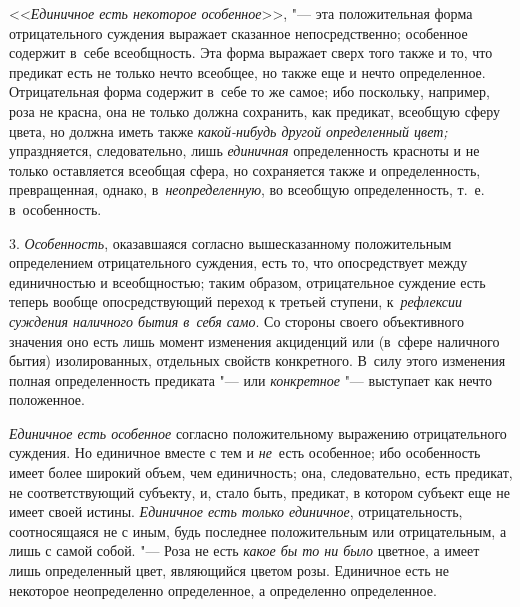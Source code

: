 <<{\em Единичное есть некоторое особенное}>>, "--- эта положительная форма
отрицательного суждения выражает сказанное непосредственно; особенное содержит
в~себе всеобщность. Эта форма выражает сверх того также и то, что предикат есть
не только нечто всеобщее, но также еще и нечто определенное. Отрицательная
форма содержит в~себе то же самое; ибо поскольку, например, роза не красна, она
не только должна сохранить, как предикат, всеобщую сферу цвета, но должна иметь
также {\em какой-нибудь другой определенный цвет;} упраздняется, следовательно,
лишь {\em единичная} определенность красноты и не только оставляется всеобщая
сфера, но сохраняется также и определенность, превращенная, однако,
в~{\em неопределенную}, во всеобщую определенность, т.~е. в~особенность.

3. {\em Особенность}, оказавшаяся согласно вышесказанному положительным
определением отрицательного суждения, есть то, что опосредствует между
единичностью и всеобщностью; таким образом, отрицательное суждение есть теперь
вообще опосредствующий переход к третьей ступени, к~{\em рефлексии суждения
наличного бытия в~себя само}. Со стороны своего объективного значения оно есть
лишь момент изменения акциденций или (в~сфере наличного бытия) изолированных,
отдельных свойств конкретного. В~силу этого изменения полная определенность
предиката "--- или {\em конкретное} "--- выступает как нечто положенное.

{\em Единичное есть особенное} согласно положительному выражению
отрицательного суждения. Но единичное вместе с тем и
{\em не}~есть особенное; ибо особенность имеет более широкий объем,
чем единичность; она, следовательно, есть предикат, не соответствующий
субъекту, и, стало быть, предикат, в котором субъект еще не имеет своей
истины. {\em Единичное есть только единичное}, отрицательность, соотносящаяся
не с иным, будь последнее положительным или отрицательным, а лишь с самой
собой. "--- Роза не есть {\em какое бы то ни было} цветное, а имеет лишь
определенный цвет, являющийся цветом розы. Единичное есть не некоторое
неопределенно определенное, а определенно определенное.

